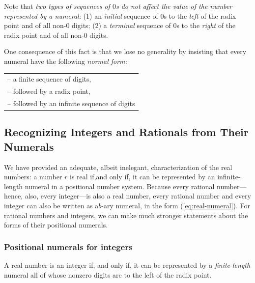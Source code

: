 \medskip

Note that {\em two types of sequences of $0$s do not affect the value
  of the number represented by a numeral:} (1) an {\em initial}
sequence of $0$s to the {\em left} of the radix point and of all
non-$0$ digits; (2) a {\em terminal} sequence of $0$s to the {\em
  right} of the radix point and of all non-$0$ digits.

One consequence of this fact is that we lose no generality by
insisting that every numeral have the following {\em normal form:}

\smallskip

\hspace*{.15in}
\begin{tabular}{l}
-- a finite sequence of digits, \\
-- followed by a radix point, \\
-- followed by an infinite sequence of digits
\end{tabular}


\subsection{Recognizing Integers and  Rationals from Their Numerals}
\label{sec:special-numerals-N-Q}

We have provided an adequate, albeit inelegant, characterization of
the real numbers: a number $r$ is real if,and only if, it can be
represented by an infinite-length numeral in a positional number
system.  Because every rational number---hence, also, every
integer---is also a real number, every rational number and every
integer can also be written as a$b$-ary numeral, in the form
(\ref{eq:real-numeral}).  For rational numbers and integers, we can
make much stronger statements about the forms of their positional
numerals.

\subsubsection{Positional numerals for integers}
\label{sec:special-numerals-N}

\begin{prop}
\label{thm:integer-real}
A real number is an integer if, and only if, it can be represented by
a {\em finite-length} numeral all of whose nonzero digits are to the
left of the radix point.
\end{prop}


